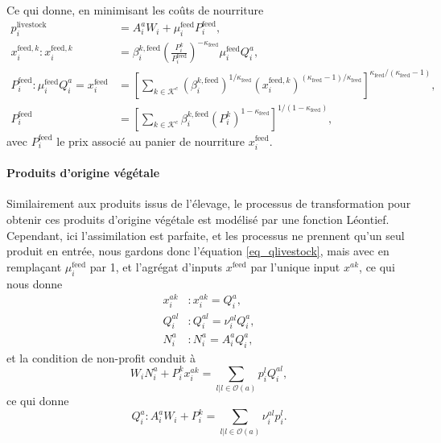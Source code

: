 Ce qui donne, en minimisant les coûts de nourriture
\begin{align}
    p_i^{\text{livestock}}                                                            & = A_i^a W_i + \mu^\text{feed}_i P^{\text{feed}}_i,
    \\
    \label{eq_xfeedik} x^{\text{feed},k}_i : x^{\text{feed},k}_i                      & = \beta_i^{k, \text{feed}} \left( \frac{P_i^k}{P^{\text{feed}}_i} \right)^{-\kappa_{\text{feed}}} \mu^\text{feed}_i Q_i^a,                                                                                                \\
    \label{eq_pfeedi} P_i^\text{feed} : \mu^{\text{feed}}_i Q_i^a = x^{\text{feed}}_i & = \left[\sum_{k \in \mathcal{K}^c} (\beta_i^{k, \text{feed}})^{1/\kappa_{\text{feed}}} (x^{\text{feed},k}_i)^{(\kappa_{\text{feed}} - 1)/\kappa_{\text{feed}}} \right]^{\kappa_{\text{feed}}/(\kappa_{\text{feed}} - 1)},
    \\
    P^{\text{feed}}_i                                                                 & = \left[ \sum_{k \in \mathcal{K}^c} \beta_i^{k, \text{feed}} (P_i^k)^{1 - \kappa_{\text{feed}}}\right]^{1/(1 - \kappa_{\text{feed}})},
\end{align}
avec $P_i^\text{feed}$ le prix associé au panier de nourriture $x_i^\text{feed}$.

\paragraph{Produits d’origine végétale} Similairement aux produits issus de l’élevage, le processus de transformation pour obtenir ces produits d’origine végétale est modélisé par une fonction Léontief. Cependant, ici l’assimilation est parfaite, et les processus ne prennent qu’un seul produit en entrée, nous gardons donc l’équation \ref{eq_qlivestock}, mais avec en remplaçant $\mu_i^\text{feed}$ par 1, et l’agrégat d’inputs $x^{\text{feed}}$ par l’unique input $x^{ak}$, ce qui nous donne
\begin{align}
    \label{eq_xiak}x^{ak}_i & : x^{ak}_i = Q_i^a,            \\
    Q_i^{al}                & : Q_i^{al} = \nu_i^{al} Q_i^a, \\
    \label{eq_nia} N_i^a    & :    N_i^a = A_i^a Q_i^a,
\end{align}
et la condition de non-profit conduit à
\begin{equation}
    W_i N_i^a + P_i^k x_i^{ak} = \sum_{{l|l\in \mathcal{O}(a)}} p_i^l Q_i^{al},
\end{equation}
ce qui donne
\begin{equation}\label{eq_qia}
    Q_i^a: A_i^a W_i + P_i^k = \sum_{l|l\in \mathcal{O}(a)} \nu_i^{al} p_i^{l}.
\end{equation}

